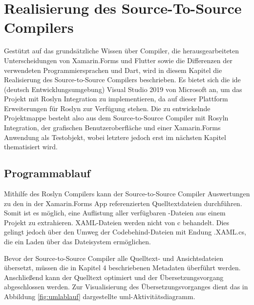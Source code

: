 \chapter{Realisierung des Source-To-Source Compilers}
\label{chap:Realisierung}
Gestützt auf das grundsätzliche Wissen über Compiler, die herausgearbeiteten Unterscheidungen von  Xamarin.Forms und Flutter sowie die Differenzen der verwendeten Programmiersprachen  \Csharp{} und Dart, wird in diesem Kapitel die Realisierung des Source-to-Source Compilers beschrieben.  Es bietet sich die \ac{ide} (deutsch Entwicklungsumgebung) Visual Studio 2019 von Microsoft an,  um das Projekt mit Roslyn Integration zu implementieren,  da auf dieser Plattform Erweiterungen für Roslyn zur Verfügung stehen.
Die zu entwickelnde Projektmappe besteht also aus dem Source-to-Source Compiler mit Rosyln Integration, der grafischen Benutzeroberfläche und einer Xamarin.Forms Anwendung als Testobjekt,  wobei letztere jedoch erst im nächsten Kapitel thematisiert wird.


\section{Programmablauf}
Mithilfe des Roslyn Compilers kann der Source-to-Source Compiler Auswertungen zu den in der Xamarin.Forms App referenzierten Quelltextdateien durchführen.  Somit ist es möglich,  eine Auflistung aller verfügbaren \Csharp-Dateien aus einem Projekt zu extrahieren.  XAML-Dateien werden nicht von c behandelt.  Dies gelingt jedoch über den Umweg der Codebehind-Dateien mit Endung .XAML.cs,  die ein Laden über das Dateisystem ermöglichen. 

Bevor der Source-to-Source Compiler alle Quelltext- und Ansichtsdateien übersetzt,  müssen die in Kapitel 4 beschriebenen Metadaten überführt werden.  Anschließend kann der Quelltext optimiert und der Übersetzungsvorgang abgeschlossen werden.  Zur Visualisierung des Übersetzungsvorganges dient das in Abbildung \ref{fig:umlablauf} dargestellte \ac{uml}-Aktivitätsdiagramm.

